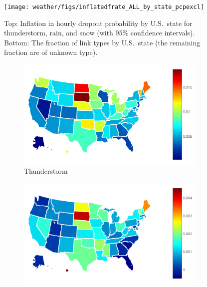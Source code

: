 
\begin{figure}[t]
\centering
\texttt{[image: weather/figs/inflatedfrate\_ALL\_by\_state\_pcpexcl]}
\caption[Inflation in hourly dropout probability by U.S.~state for
thunderstorm, rain, and snow]{\label{fig:inflatedfrate_by_state_pcp}
\figdone
Top: Inflation in hourly dropout probability by U.S.~state for thunderstorm, rain, and
	snow (with 95\% confidence intervals). Bottom: The fraction of link
	types by U.S.~state (the remaining fraction are of unknown type).
	}
\end{figure}


\begin{figure}[t]
\begin{subfigure}[t]{0.32\linewidth}
\centering
\includegraphics[width=\linewidth]{weather/figs/normalizedfratebyexclweather_ALL_iststorm_statewise_jan11todec17_heatmap}
\caption{
\label{fig:inflatedfrate_tstorm_usmap}
Thunderstorm
}
\end{subfigure}
%
\begin{subfigure}[t]{0.32\linewidth}
\centering
\includegraphics[width=\linewidth]{weather/figs/normalizedfratebyexclweather_ALL_israin_statewise_jan11todec17_heatmap}

\end{subfigure}
\end{figure}
